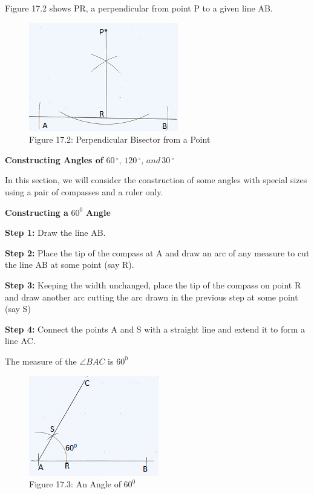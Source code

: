 \documentclass[
  a4paperpaper,
]{scrbook}
\begin{document}
Figure 17.2 shows PR, a perpendicular from point P to a given line AB.

\begin{figure}[H]

{\centering \includegraphics{figures/Images/FIG2.png}

}

\caption{Figure 17.2: Perpendicular Bisector from a Point}

\end{figure}%

\textbf{Constructing Angles of}
\(60\,^{\circ}, \,120\,^{\circ},\, and \,30\,^{\circ}\)

In this section, we will consider the construction of some angles with
special sizes using a pair of compasses and a ruler only.

\textbf{Constructing a} \(60^0\) \textbf{Angle}

\textbf{Step 1:} Draw the line AB.

\textbf{Step 2:} Place the tip of the compass at A and draw an arc of
any measure to cut the line AB at some point (say R).

\textbf{Step 3:} Keeping the width unchanged, place the tip of the
compass on point R and draw another arc cutting the arc drawn in the
previous step at some point (say S)

\textbf{Step 4:} Connect the points A and S with a straight line and
extend it to form a line AC.

The measure of the \(\angle BAC\) is \(60^0\)

\begin{figure}[H]

{\centering \includegraphics{figures/Images/FIG3.png}

}

\caption{Figure 17.3: An Angle of \(60^0\)}

\end{figure}%
\end{document}
